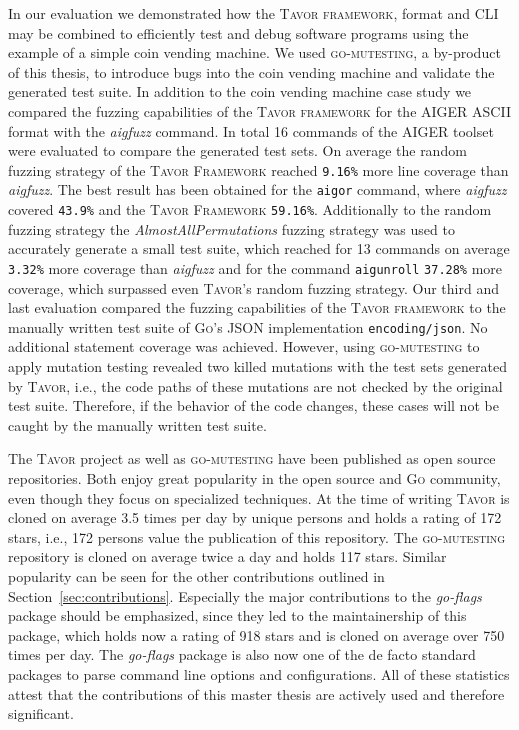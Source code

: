 In our evaluation we demonstrated how the \textsc{Tavor framework}, format and CLI may be combined to efficiently test and debug software programs using the example of a simple coin vending machine. We used \textsc{go-mutesting}, a by-product of this thesis, to introduce bugs into the coin vending machine and validate the generated test suite. In addition to the coin vending machine case study we compared the fuzzing capabilities of the \textsc{Tavor framework} for the AIGER ASCII format with the \emph{aigfuzz} command. In total 16 commands of the AIGER toolset were evaluated to compare the generated test sets. On average the random fuzzing strategy of the \textsc{Tavor Framework} reached \texttt{9.16\%} more line coverage than \emph{aigfuzz}. The best result has been obtained for the \texttt{aigor} command, where \emph{aigfuzz} covered \texttt{43.9\%} and the \textsc{Tavor Framework} \texttt{59.16\%}. Additionally to the random fuzzing strategy the \emph{AlmostAllPermutations} fuzzing strategy was used to accurately generate a small test suite, which reached for 13 commands on average \texttt{3.32\%} more coverage than \emph{aigfuzz} and for the command \texttt{aigunroll} \texttt{37.28\%} more coverage, which surpassed even \textsc{Tavor}'s random fuzzing strategy. Our third and last evaluation compared the fuzzing capabilities of the \textsc{Tavor framework} to the manually written test suite of \textsc{Go}'s JSON implementation \texttt{encoding/json}. No additional statement coverage was achieved. However, using \textsc{go-mutesting} to apply mutation testing revealed two killed mutations with the test sets generated by \textsc{Tavor}, i.e., the code paths of these mutations are not checked by the original test suite. Therefore, if the behavior of the code changes, these cases will not be caught by the manually written test suite.

The \textsc{Tavor} project as well as \textsc{go-mutesting} have been published as open source repositories. Both enjoy great popularity in the open source and \textsc{Go} community, even though they focus on specialized techniques. At the time of writing \textsc{Tavor} is cloned on average 3.5 times per day by unique persons and holds a rating of 172 stars, i.e., 172 persons value the publication of this repository. The \textsc{go-mutesting} repository is cloned on average twice a day and holds 117 stars. Similar popularity can be seen for the other contributions outlined in Section~\ref{sec:contributions}. Especially the major contributions to the \emph{go-flags} package should be emphasized, since they led to the maintainership of this package, which holds now a rating of 918 stars and is cloned on average over 750 times per day. The \emph{go-flags} package is also now one of the de facto standard packages to parse command line options and configurations. All of these statistics attest that the contributions of this master thesis are actively used and therefore significant.

